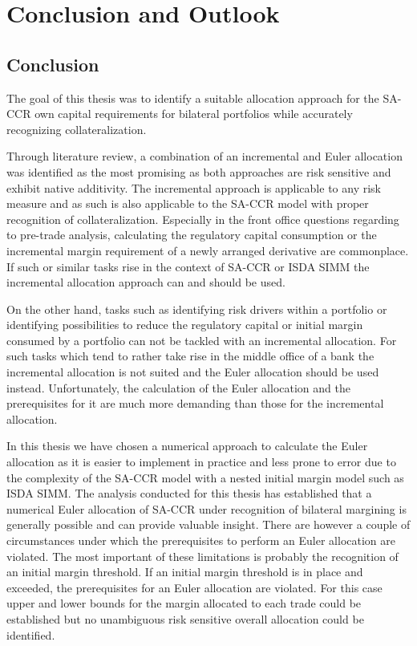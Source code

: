 \documentclass[../Thesis_AHoecherl.tex]{subfiles}
\begin{document}
\chapter{Conclusion and Outlook}\label{sec:Outlook and Conclusion}
\section{Conclusion}\label{sec:Conclusion}
The goal of this thesis was to identify a suitable allocation approach for the \gls{SA-CCR} own capital requirements for bilateral portfolios while accurately recognizing collateralization.

Through literature review, a combination of an incremental and Euler allocation was identified as the most promising as both approaches are risk sensitive and exhibit native additivity. 
The incremental approach is applicable to any risk measure and as such is also applicable to the \gls{SA-CCR} model with proper recognition of collateralization. Especially in the front office questions regarding to pre-trade analysis, calculating the regulatory capital consumption or the incremental margin requirement of a newly arranged derivative are commonplace.
If such or similar tasks rise in the context of \gls{SA-CCR} or \gls{ISDA SIMM} the incremental allocation approach can and should be used.

On the other hand, tasks such as identifying risk drivers within a portfolio or identifying possibilities to reduce the regulatory capital or initial margin consumed by a portfolio can not be tackled with an incremental allocation.
For such tasks which tend to rather take rise in the middle office of a bank the incremental allocation is not suited and the Euler allocation should be used instead.
Unfortunately, the calculation of the Euler allocation and the prerequisites for it are much more demanding than those for the incremental allocation.

In this thesis we have chosen a numerical approach to calculate the Euler allocation as it is easier to implement in practice and less prone to error due to the complexity of the \gls{SA-CCR} model with a nested initial margin model such as \gls{ISDA SIMM}.
The analysis conducted for this thesis has established that a numerical Euler allocation of \gls{SA-CCR} under recognition of bilateral margining is generally possible and can provide valuable insight. There are however a couple of circumstances under which the prerequisites to perform an Euler allocation are violated.
The most important of these limitations is probably the recognition of an initial margin threshold. If an initial margin threshold is in place and exceeded, the prerequisites for an Euler allocation are violated. 
For this case upper and lower bounds for the margin allocated to each trade could be established but no unambiguous risk sensitive overall allocation could be identified.
\end{document}
